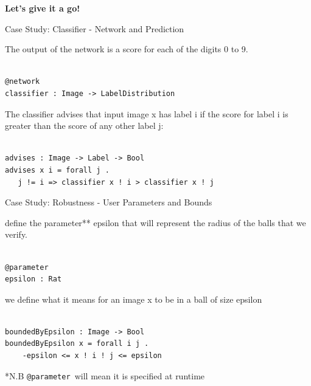 \documentclass[t,compress,aspectratio=169]{beamer}
\begin{document}
\begin{frame}
\vspace {8em}

    \begin{center}
        \Huge{\textcolor{aisecred}{\textbf{Let's give it a go!}}}
    \end{center}
\end{frame}




\begin{frame}[fragile]{Case Study: Classifier - Network and Prediction}


The output of the network is a score for each of the digits 0 to 9.

\begin{verbatim}

@network
classifier : Image -> LabelDistribution

\end{verbatim}



The classifier advises that input image x has label i if the score for label i is greater than the score of any other label j:


\begin{verbatim}

advises : Image -> Label -> Bool
advises x i = forall j . 
   j != i => classifier x ! i > classifier x ! j

\end{verbatim}
\end{frame}


\begin{frame}[fragile]{Case Study: Robustness - User Parameters and Bounds}

define the parameter** epsilon that will represent the radius of the balls that we verify.

\begin{verbatim}

@parameter
epsilon : Rat
\end{verbatim}

 we define what it means for an image x to be in a ball of size epsilon

\begin{verbatim}

boundedByEpsilon : Image -> Bool
boundedByEpsilon x = forall i j . 
    -epsilon <= x ! i ! j <= epsilon

\end{verbatim}


\footnotesize **N.B \texttt{@parameter }will mean it is specified at runtime

\end{frame}
\end{document}
